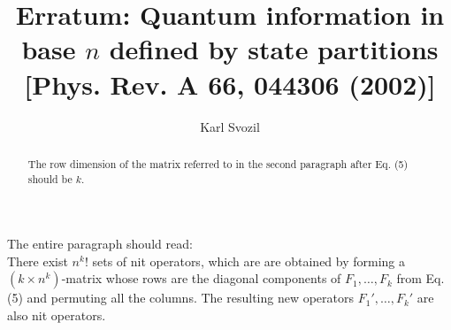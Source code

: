 \documentclass[pra,preprint,showpacs]{revtex4}
\begin{document}
\title{Erratum: Quantum information in base $n$ defined by state partitions
[Phys. Rev. A 66, 044306 (2002)]}
\author{Karl Svozil}



\begin{abstract}
The row dimension of the matrix referred to in the second paragraph after Eq. (5)
should be $k$.
\end{abstract}
\maketitle

The entire paragraph should read:\\
There exist $n^k!$  sets of nit operators,
which are
are obtained by forming a $(k \times n^k)$-matrix
whose rows are the diagonal components of $F_1,\ldots,F_k$  from Eq.
(5)
and permuting all the columns.
The resulting new operators $F_1',\ldots,F_k'$ are also nit operators.
\end{document}
